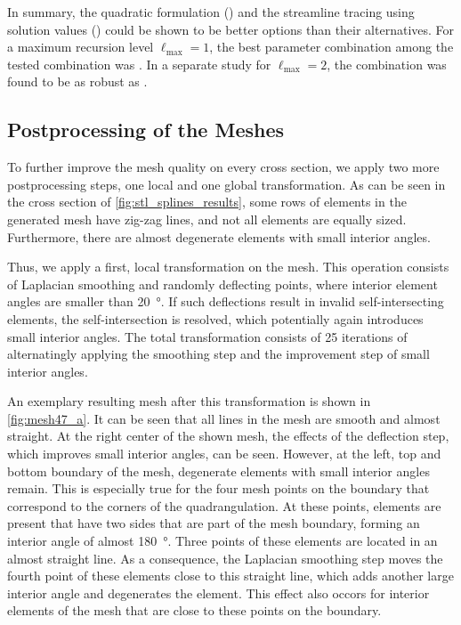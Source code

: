 In summary, the quadratic formulation () and the streamline tracing using solution values () could be shown to be better options than their alternatives. For a maximum recursion level $\ell_\text{max}=1$, the best parameter combination among the tested combination was . In a separate study for $\ell_\text{max}=2$, the combination  was found to be as robust as .
%

\subsection{Postprocessing of the Meshes}

To further improve the mesh quality on every cross section, we apply two more postprocessing steps, one local and one global transformation.
As can be seen in the cross section of \cref{fig:stl_splines_results}, some rows of elements in the generated mesh have zig-zag lines, and not all elements are equally sized. Furthermore, there are almost degenerate elements with small interior angles. 

Thus, we apply a first, local transformation on the mesh. This operation consists of Laplacian smoothing and randomly deflecting points, where interior element angles are smaller than \SI{20}{\degree}. If such deflections result in invalid self-intersecting elements, the self-intersection is resolved, which potentially again introduces small interior angles. The total transformation consists of 25 iterations of alternatingly applying the smoothing step and the improvement step of small interior angles.

An exemplary resulting mesh after this transformation is shown in \cref{fig:mesh47_a}. It can be seen that all lines in the mesh are smooth and almost straight. At the right center of the shown mesh, the effects of the deflection step, which improves small interior angles, can be seen. However, at the left, top and bottom boundary of the mesh, degenerate elements with small interior angles remain. This is especially true for the four mesh points on the boundary that correspond to the corners of the quadrangulation. At these points, elements are present that have two sides that are part of the mesh boundary, forming an interior angle of almost \SI{180}{\degree}. Three points of these elements are located in an almost straight line. As a consequence, the Laplacian smoothing step moves the fourth point of these elements close to this straight line, which adds another large interior angle and degenerates the element. This effect also occors for interior elements of the mesh that are close to these points on the boundary.

